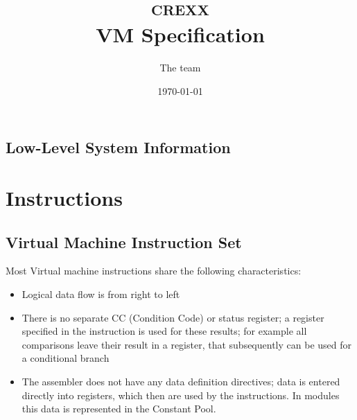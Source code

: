 

\renewcommand{\isbn}{978-90-819090-1-3}
\setcounter{tocdepth}{1}
\title{\textsc{crexx}\protect{}\\VM Specification}

\author{The \crexx{} team}
\date{\null\hfill \today}
\maketitle
{}
\pagestyle{plain}
\frontmatter
{}
\pagestyle{plain}

\tableofcontents

\newpage
{}
\frontmatter
\large







\mainmatter

\chapter{Low-Level System Information}


\part{Instructions}


\chapter{\crexx{} Virtual Machine Instruction Set}
Most \crexx{} Virtual machine instructions share the following
characteristics:
\begin{itemize}
\item Logical data flow is from right to left
  \item There is no separate CC (Condition Code) or status register; a
    register specified in the instruction is used for these results;
    for example all comparisons leave their result in a register, that
    subsequently can be used for a conditional branch
    \item The assembler does not have any data definition directives;
      data is entered directly into registers, which then are used by
      the instructions. In  modules this data is
      represented in the Constant Pool. 
\end{itemize}

